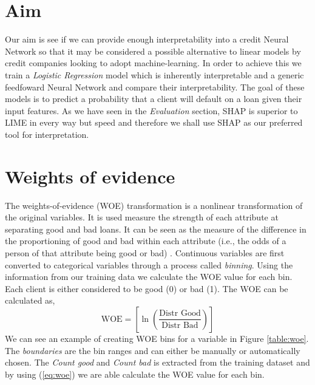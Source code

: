\section{Aim}
 Our aim is see if we can provide enough interpretability into a credit Neural Network so that it may be considered a possible alternative to linear models by credit companies looking to adopt machine-learning. In order to achieve this we train a \emph{Logistic Regression} model which is inherently interpretable and a generic feedfoward Neural Network and compare their interpretability. The goal of these models is to predict a probability that a client will default on a loan given their input features. As we have seen in the \emph{Evaluation} section, SHAP is superior to LIME in every way but speed and therefore we shall use SHAP as our preferred tool for interpretation.
 
\section{Weights of evidence}
 The weights-of-evidence (WOE) transformation \cite{Siddiqi2005CreditRS} is a nonlinear transformation of the original variables. It is used measure the strength of each attribute at separating good and bad loans. It can be seen as the measure of the difference in the proportioning of good and bad within each attribute (i.e., the odds of a person of that attribute being good or bad) \cite{Siddiqi2005CreditRS}.  Continuous variables are first converted to categorical variables through a process called \emph{binning}. Using the information from our training data we calculate the WOE value for each bin. Each client is either considered to be good (0) or bad (1).
 The WOE can be calculated as,
  \begin{equation}
     \mbox{WOE} = \left[ \ln{\left(\frac{\mbox{Distr Good}}{\mbox{Distr Bad}}\right)} \right] 
     \label{eq:woe}
 \end{equation}
We can see an example of creating WOE bins for a variable  in Figure \ref{table:woe}. The \emph{boundaries} are the bin ranges and can either be manually or automatically chosen. The \emph{Count good} and \emph{Count bad} is extracted from the training dataset and by using (\ref{eq:woe}) we are able calculate the WOE value for each bin. 
